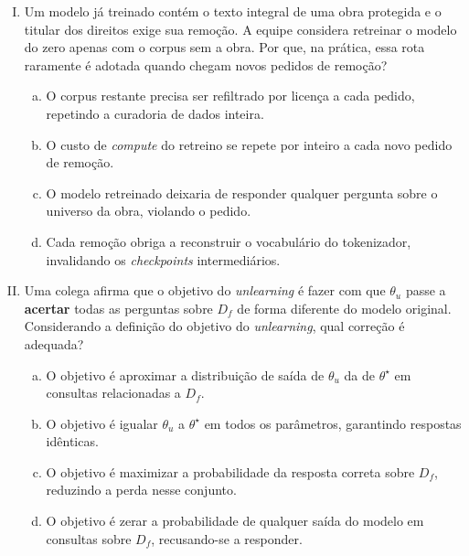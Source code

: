 \documentclass{dlproblemset}
\begin{document}
\begin{enumerate}[I)]

    \item Um modelo já treinado contém o texto integral de uma obra protegida e o titular dos direitos exige sua remoção. A equipe considera retreinar o modelo do zero apenas com o corpus sem a obra. Por que, na prática, essa rota raramente é adotada quando chegam novos pedidos de remoção?
    \begin{enumerate}[(a)]
        \item O corpus restante precisa ser refiltrado por licença a cada pedido, repetindo a curadoria de dados inteira.
        \item O custo de \textit{compute} do retreino se repete por inteiro a cada novo pedido de remoção.
        \item O modelo retreinado deixaria de responder qualquer pergunta sobre o universo da obra, violando o pedido.
        \item Cada remoção obriga a reconstruir o vocabulário do tokenizador, invalidando os \textit{checkpoints} intermediários.
    \end{enumerate}

    \item Uma colega afirma que o objetivo do \textit{unlearning} é fazer com que $\theta_u$ passe a \textbf{acertar} todas as perguntas sobre $D_f$ de forma diferente do modelo original. Considerando a definição do objetivo do \textit{unlearning}, qual correção é adequada?
    \begin{enumerate}[(a)]
        \item O objetivo é aproximar a distribuição de saída de $\theta_u$ da de $\theta^\star$ em consultas relacionadas a $D_f$.
        \item O objetivo é igualar $\theta_u$ a $\theta^\star$ em todos os parâmetros, garantindo respostas idênticas.
        \item O objetivo é maximizar a probabilidade da resposta correta sobre $D_f$, reduzindo a perda nesse conjunto.
        \item O objetivo é zerar a probabilidade de qualquer saída do modelo em consultas sobre $D_f$, recusando-se a responder.
    \end{enumerate}


\end{enumerate}
\end{document}
